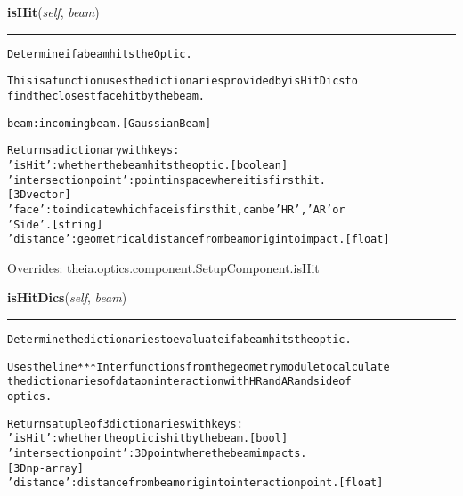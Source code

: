     \vspace{0.5ex}

\hspace{.8\funcindent}\begin{boxedminipage}{\funcwidth}

    \raggedright \textbf{isHit}(\textit{self}, \textit{beam})

    \vspace{-1.5ex}

    \rule{\textwidth}{0.5\fboxrule}
\setlength{\parskip}{2ex}
\begin{alltt}
Determine if a beam hits the Optic.

This is a function uses the dictionaries provided by isHitDics to
find the closest face hit by the beam.

beam: incoming beam. [GaussianBeam]

Returns a dictionary with keys:
    'isHit': whether the beam hits the optic. [boolean]
    'intersection point': point in space where it is first hit.
            [3D vector]
    'face': to indicate which face is first hit, can be 'HR', 'AR' or
        'Side'. [string]
    'distance': geometrical distance from beam origin to impact. [float]
\end{alltt}

\setlength{\parskip}{1ex}
      Overrides: theia.optics.component.SetupComponent.isHit

    \end{boxedminipage}

    \label{theia:optics:optic:Optic:isHitDics}

    \vspace{0.5ex}

\hspace{.8\funcindent}\begin{boxedminipage}{\funcwidth}

    \raggedright \textbf{isHitDics}(\textit{self}, \textit{beam})

    \vspace{-1.5ex}

    \rule{\textwidth}{0.5\fboxrule}
\setlength{\parskip}{2ex}
\begin{alltt}
Determine the dictionaries to evaluate if a beam hits the optic.

Uses the line***Inter functions from the geometry module to calculate
the dictionaries of data on interaction with HR and AR and side of
optics.

Returns a tuple of 3 dictionaries with keys:
    'isHit': whether the optic is hit by the beam. [bool]
    'intersection point': 3D point where the beam impacts.
        [3D np-array]
    'distance': distance from beam origin to interaction point. [float]
\end{alltt}

\setlength{\parskip}{1ex}
    \end{boxedminipage}

